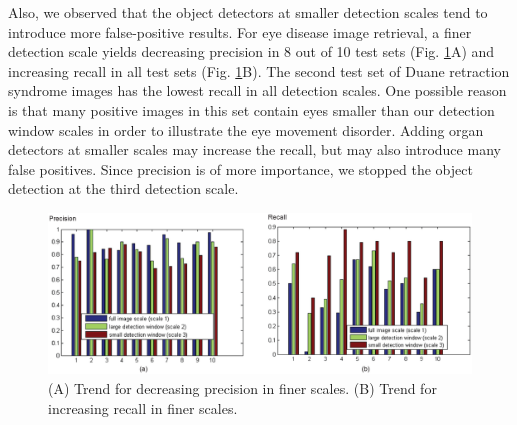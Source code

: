 Also, we observed that the object detectors at smaller detection
scales tend to introduce more false-positive results. For eye
disease image retrieval, a finer detection scale yields decreasing
precision in 8 out of 10 test sets (Fig. \ref{Chap2_trend}A) and increasing
recall in all test sets (Fig. \ref{Chap2_trend}B). The second test set of Duane
retraction syndrome images has the lowest recall in all detection
scales. One possible reason is that many positive images in this
set contain eyes smaller than our detection window scales in
order to illustrate the eye movement disorder. Adding organ
detectors at smaller scales may increase the recall, but may also
introduce many false positives. Since precision is of more
importance, we stopped the object detection at the third detection
scale.
\begin{figure}[t]
\vspace{0em}
\centering
\includegraphics[width=\textwidth]{Chap2_trend}
\vspace {0em}\caption{(A) Trend for decreasing precision in finer scales. (B) Trend for increasing recall in finer scales.}
\label{Chap2_trend}
\vspace {0em}
\end{figure}



